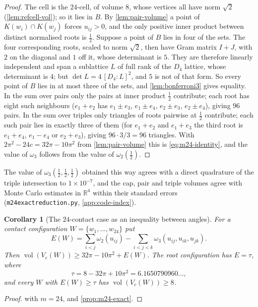 \documentclass[11pt,reqno]{amsart}
\renewcommand{\_}{\origunderscore\allowbreak}
\numberwithin{equation}{section}
\theoremstyle{plain}
\newtheorem{cor}[thm]{Corollary}
\theoremstyle{definition}
\theoremstyle{remark}
\DeclareMathOperator{\vol}{vol}
\begin{document}
\begin{proof}
The cell is the $24$-cell, of volume $8$, whose vertices all have norm
$\sqrt2$ (\cref{lem:refcell-vol}); so it lies in $B$. By
\cref{lem:pair-volume} a point of $K(w_i)\cap K(w_j)$ forces
$u_{ij}>0$, and the only positive inner product between distinct
normalised roots is $\tfrac12$. Suppose a point of $B$ lies in four of
the sets. The four corresponding roots, scaled to norm $\sqrt2$, then
have Gram matrix $I+J$, with $2$ on the diagonal and $1$ off it, whose
determinant is $5$. They are therefore linearly independent and span a
sublattice $L$ of full rank of the $D_4$ lattice, whose determinant is
$4$; but $\det L=4\,[D_4:L]^2$, and $5$ is not of that form. So every
point of $B$ lies in at most three of the sets, and
\cref{lem:bonferroni3} gives equality. In the sum over pairs only the
pairs at inner product $\tfrac12$ contribute; each root has eight such
neighbours ($e_1+e_2$ has $e_1\pm e_3$, $e_1\pm e_4$, $e_2\pm e_3$,
$e_2\pm e_4$), giving $96$ pairs. In the sum over triples only triangles
of roots pairwise at $\tfrac12$ contribute; each such pair lies in
exactly three of them (for $e_1+e_2$ and $e_1+e_3$ the third root is
$e_1+e_4$, $e_1-e_4$ or $e_2+e_3$), giving $96\cdot3/3=96$ triangles.
With $2\pi^2-24c=32\pi-10\pi^2$ from \cref{lem:pair-volume} this is
\eqref{eq:m24-identity}, and the value of $\omega_3$ follows from the
value of $\omega_2(\tfrac12)$.
\end{proof}

The value of $\omega_3(\tfrac12,\tfrac12,\tfrac12)$ obtained this way
agrees with a direct quadrature of the triple intersection to
$1\times10^{-7}$, and the cap, pair and triple volumes agree with
Monte Carlo estimates in $\mathbb{R}^4$ within their standard errors
(\texttt{m24\_exact\_reduction.py}, \cref{app:code-index}).

\begin{cor}[The $24$-contact case as an inequality between angles]\label{cor:m24-reduction}
For a contact configuration $W=\{w_1,\dots,w_{24}\}$ put
\[
  E(W)=\sum_{i<j}\omega_2(u_{ij})-\sum_{i<j<k}\omega_3(u_{ij},u_{ik},u_{jk}).
\]
Then $\vol(V_c(W))\ge32\pi-10\pi^2+E(W)$. The root configuration has
$E=\tau$, where
\[
  \tau=8-32\pi+10\pi^2=6.1650790960\ldots,
\]
and every $W$ with $E(W)\ge\tau$ has $\vol(V_c(W))\ge8$.
\end{cor}

\begin{proof}
 with $m=24$, and \cref{prop:m24-exact}.
\end{proof}
\end{document}
